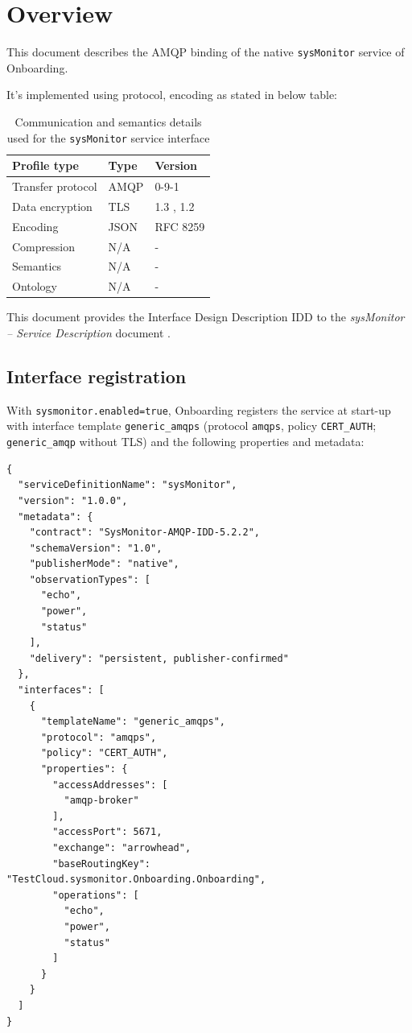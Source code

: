 \documentclass[a4paper]{arrowhead}
\begin{document}
\section{Overview}
\label{sec:overview}

This document describes the AMQP binding of the native \texttt{sysMonitor} service of Onboarding.

It's implemented using protocol, encoding as stated in below table:
\begin{table}[ht!]
  \centering
  \begin{tabular}{|l|l|l|}
    \hline
    \rowcolor{gray!33} Profile type & Type & Version \\ \hline
    Transfer protocol & AMQP & 0-9-1 \cite{amqp091} \\ \hline
    Data encryption & TLS & 1.3 \cite{rfc8446}, 1.2 \cite{rfc5246} \\ \hline
    Encoding & JSON & RFC 8259 \cite{rfc8259} \\ \hline
    Compression & N/A & - \\ \hline
    Semantics & N/A & - \\ \hline
    Ontology & N/A & - \\ \hline
  \end{tabular}
  \caption{Communication and semantics details used for the \texttt{sysMonitor} service interface}
  \label{tab:comunication_semantics_profile}
\end{table}

This document provides the Interface Design Description IDD to the \textit{sysMonitor -- Service Description} document \cite{onb-sysMonitor-sd}.

\subsection{Interface registration}

With \texttt{sysmonitor.enabled=true}, Onboarding registers the service at start-up with interface template \texttt{generic\_\allowbreak{}amqps} (protocol \texttt{amqps}, policy \texttt{CERT\_\allowbreak{}AUTH}; \texttt{generic\_\allowbreak{}amqp} without TLS) and the following properties and metadata:

\begin{lstlisting}[caption={Registered service instance (TestCloud).}]
{
  "serviceDefinitionName": "sysMonitor",
  "version": "1.0.0",
  "metadata": {
    "contract": "SysMonitor-AMQP-IDD-5.2.2",
    "schemaVersion": "1.0",
    "publisherMode": "native",
    "observationTypes": [
      "echo",
      "power",
      "status"
    ],
    "delivery": "persistent, publisher-confirmed"
  },
  "interfaces": [
    {
      "templateName": "generic_amqps",
      "protocol": "amqps",
      "policy": "CERT_AUTH",
      "properties": {
        "accessAddresses": [
          "amqp-broker"
        ],
        "accessPort": 5671,
        "exchange": "arrowhead",
        "baseRoutingKey": "TestCloud.sysmonitor.Onboarding.Onboarding",
        "operations": [
          "echo",
          "power",
          "status"
        ]
      }
    }
  ]
}
\end{lstlisting}
\end{document}
